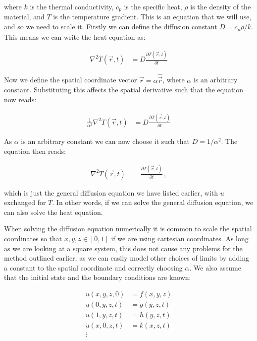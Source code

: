 \documentclass[reprint,english,notitlepage]{revtex4-1}  %
\begin{document}
where $k$ is the thermal conductivity, $c_p$ is the specific heat, $\rho$ is the density of the material, and $T$ is the temperature gradient. This is an equation that we will use, and so we need to scale it. Firstly we can define the diffusion constant $D = c_p \rho / k$. This means we can write the heat equation as:

\begin{align*}
\nabla^2 T(\vec{r},t) &= D \frac{\partial T(\vec{r},t)}{\partial t}
\end{align*}

Now we define the spatial coordinate vector $\vec{r} = \alpha \hat{\vec{r}}$, where $\alpha$ is an arbitrary constant. Substituting this affects the spatial derivative such that the equation now reads:

\begin{align*}
\frac{1}{\alpha^2} \nabla^2 T(\vec{r},t) &= D \frac{\partial T(\vec{r},t)}{\partial t}
\end{align*}  

As $\alpha$ is an arbitrary constant we can now choose it such that $D = 1/\alpha^2$. The equation then reads:

\begin{align*}
\nabla^2 T(\vec{r},t) &= \frac{\partial T(\vec{r},t)}{\partial t} \, ,
\end{align*}

which is just the general diffusion equation we have listed earlier, with $u$ exchanged for $T$. In other words, if we can solve the general diffusion equation, we can also solve the heat equation.

When solving the diffusion equation numerically it is common to scale the spatial coordinates so that $x,y,z \in [0,1]$ if we are using cartesian coordinates. As long as we are looking at a square system, this does not cause any problems for the method outlined earlier, as we can easily model other choices of limits by adding a constant to the spatial coordinate and correctly choosing $\alpha$. We also assume that the initial state and the boundary conditions are known: 

\begin{align*}
u(x,y,z,0) &= f(x,y,z) \\
u(0,y,z,t) &= g(y,z,t) \\
u(1,y,z,t) &= h(y,z,t) \\
u(x,0,z,t) &= k(x,z,t) \\
\vdots 
\end{align*}
\end{document}
